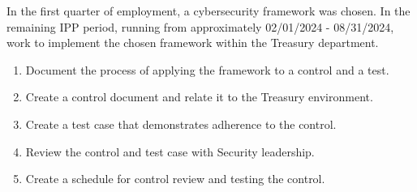 In the first quarter of employment, a cybersecurity framework was chosen. In the remaining IPP period, running from approximately 02/01/2024 - 08/31/2024, work to implement the chosen framework within the Treasury department.

\begin{enumerate}
          \item Document the process of applying the framework to a control and a test.
          \item Create a control document and relate it to the Treasury environment.
          \item Create a test case that demonstrates adherence to the control.
          \item Review the control and test case with Security leadership.
          \item Create a schedule for control review and testing the control.
\end{enumerate}